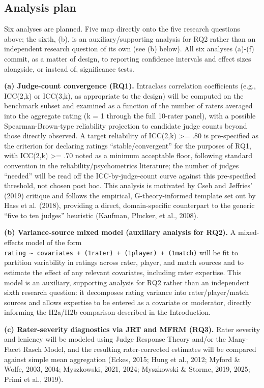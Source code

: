 \documentclass[
  12pt,
]{article}
\begin{document}
\subsection{Analysis plan}\label{analysis-plan}

Six analyses are planned. Five map directly onto the five research
questions above; the sixth, (b), is an auxiliary/supporting analysis for
RQ2 rather than an independent research question of its own (see (b)
below). All six analyses (a)-(f) commit, as a matter of design, to
reporting confidence intervals and effect sizes alongside, or instead
of, significance tests.

\textbf{(a) Judge-count convergence (RQ1).} Intraclass correlation
coefficients (e.g., ICC(2,k) or ICC(3,k), as appropriate to the design)
will be computed on the benchmark subset and examined as a function of
the number of raters averaged into the aggregate rating (k = 1 through
the full 10-rater panel), with a possible Spearman-Brown-type
reliability projection to candidate judge counts beyond those directly
observed. A target reliability of ICC(2,k) \textgreater= .80 is
pre-specified as the criterion for declaring ratings
``stable/convergent'' for the purposes of RQ1, with ICC(2,k)
\textgreater= .70 noted as a minimum acceptable floor, following
standard convention in the reliability/psychometrics literature; the
number of judges ``needed'' will be read off the ICC-by-judge-count
curve against this pre-specified threshold, not chosen post hoc. This
analysis is motivated by Cseh and Jeffries' (2019) critique and follows
the empirical, G-theory-informed template set out by Hass et al. (2018),
providing a direct, domain-specific counterpart to the generic ``five to
ten judges'' heuristic (Kaufman, Plucker, et al., 2008).

\textbf{(b) Variance-source mixed model (auxiliary analysis for RQ2).} A
mixed-effects model of the form
\texttt{rating\ \textasciitilde{}\ covariates\ +\ (1\textbar{}rater)\ +\ (1\textbar{}player)\ +\ (1\textbar{}match)}
will be fit to partition variability in ratings across rater, player,
and match sources and to estimate the effect of any relevant covariates,
including rater expertise. This model is an auxiliary, supporting
analysis for RQ2 rather than an independent sixth research question: it
decomposes rating variance into rater/player/match sources and allows
expertise to be entered as a covariate or moderator, directly informing
the H2a/H2b comparison described in the Introduction.

\textbf{(c) Rater-severity diagnostics via JRT and MFRM (RQ3).} Rater
severity and leniency will be modeled using Judge Response Theory and/or
the Many-Facet Rasch Model, and the resulting rater-corrected estimates
will be compared against simple mean aggregation (Eckes, 2015; Hung et
al., 2012; Myford \& Wolfe, 2003, 2004; Myszkowski, 2021, 2024;
Myszkowski \& Storme, 2019, 2025; Primi et al., 2019).
\end{document}
